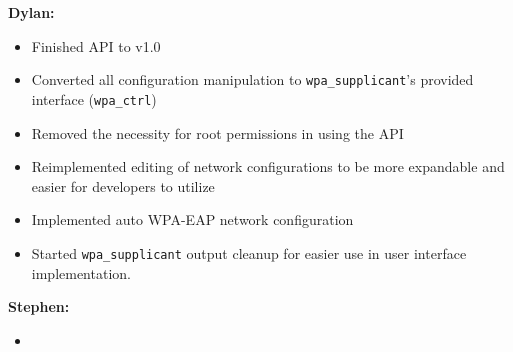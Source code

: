 \documentclass[11pt]{article}
\begin{document}
\textbf{Dylan:}
\begin{itemize}
  \item Finished API to v1.0
  \item Converted all configuration manipulation to \texttt{wpa\_supplicant}'s
    provided interface (\texttt{wpa\_ctrl})
  \item Removed the necessity for root permissions in using the API
  \item Reimplemented editing of network configurations to be more expandable
    and easier for developers to utilize
  \item Implemented auto WPA-EAP network configuration
  \item Started \texttt{wpa\_supplicant} output cleanup for easier use in user
    interface implementation.
\end{itemize}

\textbf{Stephen:}
\begin{itemize}
  \item
\end{itemize}
\end{document}
